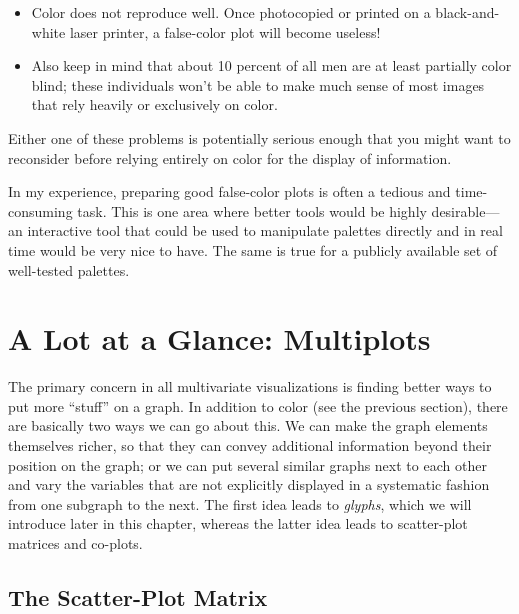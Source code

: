 \begin{itemize}
\item Color does not reproduce well. Once photocopied or printed on a
  black-and-white laser printer, a false-color plot will become
  useless!
\item Also keep in mind that about 10 percent of all men are at least
  partially color blind; these individuals won't be able to make much
  sense of most images that rely heavily or exclusively on color.
\end{itemize}

Either one of these problems is potentially serious enough that you
might want to reconsider before relying entirely on color for the
display of information.

In my experience, preparing good false-color plots is often a tedious
and time-consuming task. This is one area where better tools would be
highly desirable---an interactive tool that could be used to
manipulate palettes directly and in real time would be very nice to
have. The same is true for a publicly available set of well-tested
palettes.


\section{A Lot at a Glance: Multiplots}


The primary concern in all multivariate visualizations is finding
better ways to put more ``stuff'' on a graph. In addition to color
(see the previous section), there are basically two ways we can go
about this. We can make the graph elements themselves richer, so that
they can convey additional information beyond their position on the
graph; or we can put several similar graphs next to each other and
vary the variables that are not explicitly displayed in a systematic
fashion from one subgraph to the next. The first idea leads to
\emph{glyphs}, which we will introduce later in this chapter, whereas
the latter idea leads to scatter-plot matrices and co-plots.

\subsection{The Scatter-Plot Matrix}

